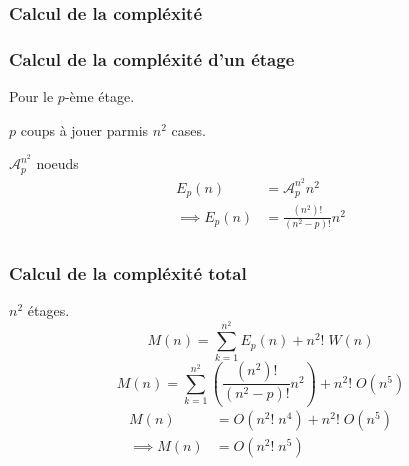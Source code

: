 \begin{frame}
  \frametitle{}
  
\end{frame}

\begin{frame}
  \frametitle{Calcul de la compléxité}
  
\end{frame}

\begin{frame}
  \frametitle{Calcul de la compléxité d'un étage}
  Pour le $p$-ème étage.

  \pause

  $p$ coups à jouer parmis $n^2$ cases.

  \pause
  $\mathcal{A}^{n^2}_p$ noeuds
  \pause
  \begin{align*}
    E_p(n) &= \mathcal{A}^{n^2}_p n^2 \\
    \implies E_p(n)  &= \frac{(n^2)!}{(n^2 - p)!} n^2 \\
  \end{align*}
\end{frame}

\begin{frame}
  \frametitle{Calcul de la compléxité total}
  $n^2$ étages.
  \pause
  \[
    M(n) = \sum^{n^2}_{k = 1} E_p(n) + n^2! \; W(n)
  \]
  \pause
  \[
    M(n) = \sum^{n^2}_{k = 1} \left(\frac{(n^2)!}{(n^2 - p)!} n^2\right)
    + n^2! \; O\left(n^5\right)
  \]
  \pause
  \begin{align*}
    M(n) &= O\left(n^2! \; n^4\right) + n^2! \; O\left(n^5\right) \\
    \implies M(n) &= O\left(n^2! \;n^5\right)
  \end{align*}
\end{frame}
  
